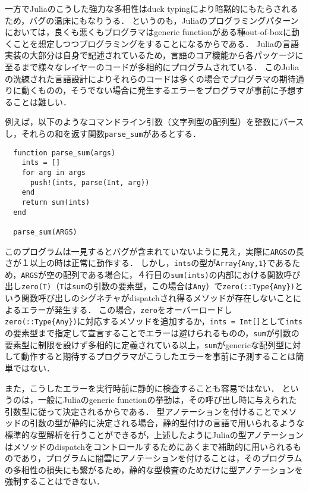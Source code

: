 一方でJuliaのこうした強力な多相性はduck typingにより暗黙的にもたらされるため，バグの温床にもなりうる．
というのも，Juliaのプログラミングパターンにおいては，良くも悪くもプログラマはgeneric functionがある種out-of-boxに動くことを想定しつつプログラミングをすることになるからである．
Juliaの言語実装の大部分は自身で記述されているため，言語のコア機能から各パッケージに至るまで様々なレイヤーのコードが多相的にプログラムされている．
このJuliaの洗練された言語設計によりそれらのコードは多くの場合でプログラマの期待通りに動くものの，そうでない場合に発生するエラーをプログラマが事前に予想することは難しい．

例えば，以下のようなコマンドライン引数（文字列型の配列型）を整数にパースし，それらの和を返す関数\texttt{parse\_sum}があるとする．

\begin{verbatim}
  function parse_sum(args)
    ints = []
    for arg in args
      push!(ints, parse(Int, arg))
    end
    return sum(ints)
  end

  parse_sum(ARGS)
\end{verbatim}

このプログラムは一見するとバグが含まれていないように見え，実際に\texttt{ARGS}の長さが１以上の時は正常に動作する．
しかし，\texttt{ints}の型が\texttt{Array\{Any,1\}}であるため，\texttt{ARGS}が空の配列である場合に，４行目の\texttt{sum(ints)}の内部における関数呼び出し\texttt{zero(T)}（\texttt{T}は\texttt{sum}の引数の要素型，この場合は\texttt{Any}）で\texttt{zero(::Type\{Any\})}という関数呼び出しのシグネチャがdispatchされ得るメソッドが存在しないことによるエラーが発生する．
この場合，\texttt{zero}をオーバーロードし\texttt{zero(::Type\{Any\})}に対応するメソッドを追加するか，\texttt{ints = Int[]}として\texttt{ints}の要素型まで指定して宣言することでエラーは避けられるものの，\texttt{sum}が引数の要素型に制限を設けず多相的に定義されている以上，\texttt{sum}がgenericな配列型に対して動作すると期待するプログラマがこうしたエラーを事前に予測することは簡単ではない．

また，こうしたエラーを実行時前に静的に検査することも容易ではない．
というのは，一般にJuliaのgeneric functionの挙動は，その呼び出し時に与えられた引数型に従って決定されるからである．
型アノテーションを付けることでメソッドの引数の型が静的に決定される場合，静的型付けの言語で用いられるような標準的な型解析を行うことができるが，上述したようにJuliaの型アノテーションはメソッドのdispatchをコントロールするためにあくまで補助的に用いられるものであり，プログラムに闇雲にアノテーションを付けることは，そのプログラムの多相性の損失にも繋がるため，静的な型検査のためだけに型アノテーションを強制することはできない．


